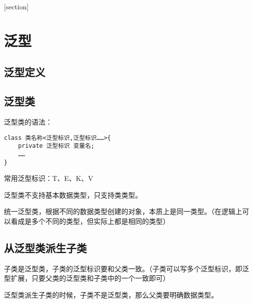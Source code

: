 \documentclass[a4paper]{report}
\begin{document}
\flushbottom%
\newcommand{\dm}[1]{\colorbox{wgray}{\lstinline`#1`}}
\newcommand{\myroman}[1]{\uppercase\expandafter{\romannumeral#1}}
[section] \renewcommand{\thenum}{\arabic{num}.} \newcommand{\num}{\refstepcounter{num}\text{\thenum}}

\newenvironment{tips}{\kaishu\zihao{-6}\color{blue}{\noindent\rule[-3pt]{\textwidth}{0.5pt}\par \em \noindent {\zihao{-5} \textcolor[rgb]{1.00,0.00,0.00}{Tips}}}\par}{\\ \rule[3mm]{\textwidth}{0.5pt}\par}

\newenvironment{zhengming}{\kaishu\zihao{-5}\color{blue}{\noindent\em 证明：}\par}{\hfill $\diamondsuit$\par}

\tableofcontents
{}%
\clearpage
{}%

\chapter{泛型}
\section{泛型定义}

\section{泛型类}

泛型类的语法：
\begin{lstlisting}
class 类名称<泛型标识,泛型标识……>{
    private 泛型标识 变量名;
    ……
}
\end{lstlisting}
常用泛型标识：T、E、K、V

泛型类不支持基本数据类型，只支持类类型。

统一泛型类，根据不同的数据类型创建的对象，本质上是同一类型。（在逻辑上可以看成是多个不同的类型，但实际上都是相同的类型）
\section{从泛型类派生子类}
子类是泛型类，子类的泛型标识要和父类一致。（子类可以写多个泛型标识，即泛型扩展，只要父类的泛型类和子类中的一个一致即可）

泛型类派生子类的时候，子类不是泛型类，那么父类要明确数据类型。
\end{document}
